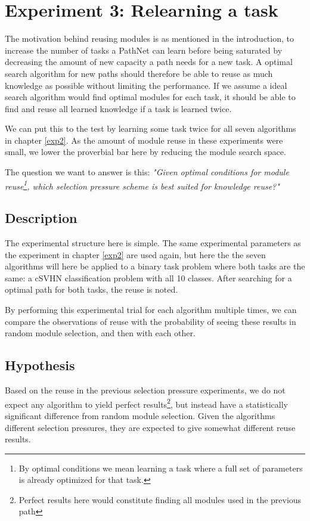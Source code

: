 \chapter{Experiment 3: Relearning a task}
\label{exp3}
The motivation behind reusing modules is as mentioned in the introduction, to increase the number of tasks a PathNet can learn before being saturated by decreasing the amount of new capacity a path needs for a new task. A optimal search algorithm for new paths should therefore be able to reuse as much knowledge as possible without limiting the performance. If we assume a ideal search algorithm would find optimal modules for each task, it should be able to find and reuse all learned knowledge if a task is learned twice. 

We can put this to the test by learning some task twice for all seven algorithms in chapter \ref{exp2}. As the amount of module reuse in these experiments were small, we lower the proverbial bar here by reducing the module search space.

The question we want to answer is this: \textit{"Given optimal conditions for module reuse\footnote{By optimal conditions we mean learning a task where a full set of parameters is already optimized for that task.}, which selection pressure scheme is best suited for knowledge reuse?"}

\section{Description}
The experimental structure here is simple. The same experimental parameters as the experiment in chapter \ref{exp2} are used again, but here the the seven algorithms will here be applied to a binary task problem where both tasks are the same: a cSVHN classification problem with all 10 classes. After searching for a optimal path for both tasks, the reuse is noted. 

By performing this experimental trial for each algorithm multiple times, we can compare the observations of reuse with the probability of seeing these results in random module selection, and then with each other. 

\section{Hypothesis}
Based on the reuse in the previous selection pressure experiments, we do not expect any algorithm to yield perfect results\footnote{Perfect results here would constitute finding all modules used in the previous path}, but instead have a statistically significant difference from random module selection. Given the algorithms different selection pressures, they are expected to give somewhat different reuse results.

